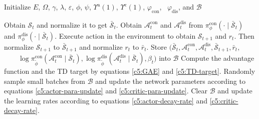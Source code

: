 \documentclass[10pt,journal,compsoc]{IEEEtran}
\renewcommand{\algorithmicrequire}{ \textbf{Input:}}
\renewcommand{\algorithmicensure}{ \textbf{Output:}}
\begin{document}
\begin{algorithm}[!t]
    \caption{MHBPPO Algorithm.}
    \label{MHBPPO algorithm}
    \renewcommand{\algorithmicrequire}{\textbf{Input:}}
    \renewcommand{\algorithmicensure}{\textbf{Output:}}

    \begin{algorithmic}[1]
        \REQUIRE Initialize $E$, $\Omega$, $\gamma$, $\lambda$, $\varepsilon$, $\phi$, $\psi$, $\Upsilon^{\text{a}}(1)$, $\Upsilon^{\text{c}}(1)$, $\varphi_{\text{con}}$, \STATEx \quad \, $\varphi_{\text{dis}}$, and $\mathcal{B}$

                \STATE Obtain $\mathcal{S}_{t}$ and normalize it to get $\bar{\mathcal{S}}_{t}$.
                \STATE Obtain $\mathcal{A}_t^{\text{con}}$ and $\mathcal{A}_t^{\text{dis}}$ from $\pi_{\phi}^{\text{con}} (\cdot \mid \bar{\mathcal{S}}_{t})$ and \STATEx \qquad $\pi_{\phi}^{\text{dis}}(\cdot \mid \bar{\mathcal{S}}_{t})$.
                \STATE Execute action in the environment to obtain ${\mathcal{S}}_{t + 1}$ \STATEx \qquad and $r_{t}$. Then normalize ${\mathcal{S}}_{t + 1}$ to $\bar{\mathcal{S}}_{t + 1}$ and \STATEx \qquad normalize $r_{t}$ to $\bar{r}_{t}$.
                \STATE Store $\Big(\bar{\mathcal{S}}_{t}, \mathcal{A}_t^{\text{con}}, \mathcal{A}_t^{\text{dis}}, \bar{\mathcal{S}}_{t + 1}, \bar{r}_{t},$ \STATEx
                $\qquad \log \pi_{\tilde{\phi}}^{\text{con}}(\mathcal{A}_t^{\text{con}} \mid \bar{\mathcal{S}}_t),
                \log \pi_{\tilde{\phi}}^{\text{dis}}(\mathcal{A}_t^{\text{dis}} \mid \bar{\mathcal{S}}_{t}), \beta_{t}\Big)$ into $\mathcal{B}$
            \ENDFOR
            \STATE Compute the advantage function and the TD target \STATEx \quad by equations \eqref{c5:GAE} and \eqref{c5:TD-target}.
                \STATE Randomly sample small batches from $\mathcal{B}$ and \STATEx \qquad update the network parameters according to \STATEx \qquad equations \eqref{c5:actor-para-update} and \eqref{c5:critic-para-update}.
            \ENDFOR
            \STATE Clear $\mathcal{B}$ and update the learning rates according to \STATEx \quad equations \eqref{c5:actor-decay-rate} and \eqref{c5:critic-decay-rate}.
        \ENDFOR
    \end{algorithmic}
\end{algorithm}
\end{document}
